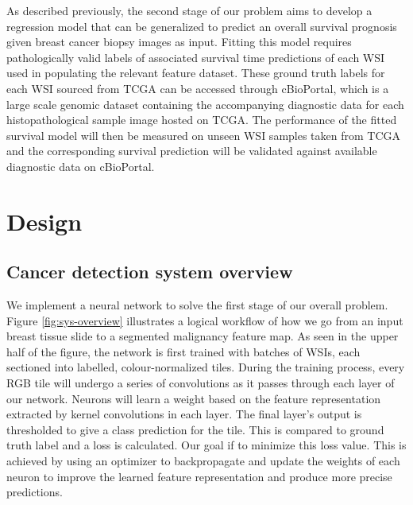 \documentclass{l4proj}
\begin{document}
As described previously, the second stage of our problem aims to develop a regression model that can be generalized to predict an overall survival prognosis given breast cancer biopsy images as input. Fitting this model requires pathologically valid labels of associated survival time predictions of each WSI used in populating the relevant feature dataset. These ground truth labels for each WSI sourced from TCGA can be accessed through cBioPortal, which is a large scale genomic dataset containing the accompanying diagnostic data for each histopathological sample image hosted on TCGA. The performance of the fitted survival model will then be measured on unseen WSI samples taken from TCGA and the corresponding survival prediction will be validated against available diagnostic data on cBioPortal. 

\chapter{Design}
\section{Cancer detection system overview} \label{sec:detection-overview-design}
We implement a neural network to solve the first stage of our overall problem. Figure \ref{fig:sys-overview} illustrates a logical workflow of how we go from an input breast tissue slide to a segmented malignancy feature map. As seen in the upper half of the figure, the network is first trained with batches of WSIs, each sectioned into labelled, colour-normalized tiles. During the training process, every RGB tile will undergo a series of convolutions as it passes through each layer of our network. Neurons will learn a weight based on the feature representation extracted by kernel convolutions in each layer. The final layer's output is thresholded to give a class prediction for the tile. This is compared to ground truth label and a loss is calculated. Our goal if to minimize this loss value. This is achieved by using an optimizer to backpropagate and update the weights of each neuron to improve the learned feature representation and produce more precise predictions. 
\end{document}
